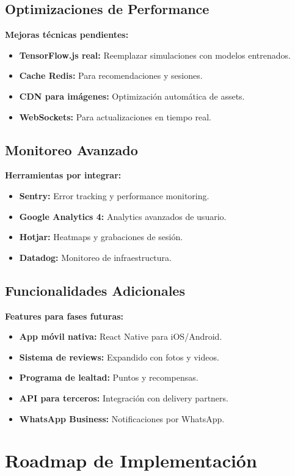 \documentclass[a4paper,12pt]{article}
\begin{document}
\subsection{Optimizaciones de Performance}
\textbf{Mejoras técnicas pendientes:}
\begin{itemize}
  \item \textbf{TensorFlow.js real:} Reemplazar simulaciones con modelos entrenados.
  \item \textbf{Cache Redis:} Para recomendaciones y sesiones.
  \item \textbf{CDN para imágenes:} Optimización automática de assets.
  \item \textbf{WebSockets:} Para actualizaciones en tiempo real.
\end{itemize}

\subsection{Monitoreo Avanzado}
\textbf{Herramientas por integrar:}
\begin{itemize}
  \item \textbf{Sentry:} Error tracking y performance monitoring.
  \item \textbf{Google Analytics 4:} Analytics avanzados de usuario.
  \item \textbf{Hotjar:} Heatmaps y grabaciones de sesión.
  \item \textbf{Datadog:} Monitoreo de infraestructura.
\end{itemize}

\subsection{Funcionalidades Adicionales}
\textbf{Features para fases futuras:}
\begin{itemize}
  \item \textbf{App móvil nativa:} React Native para iOS/Android.
  \item \textbf{Sistema de reviews:} Expandido con fotos y videos.
  \item \textbf{Programa de lealtad:} Puntos y recompensas.
  \item \textbf{API para terceros:} Integración con delivery partners.
  \item \textbf{WhatsApp Business:} Notificaciones por WhatsApp.
\end{itemize}

\section{Roadmap de Implementación}
\end{document}
